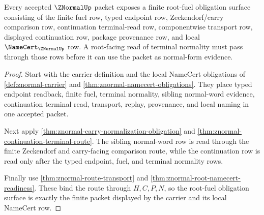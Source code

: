 \begin{theorem}
\label{thm:znormal-root-fuel-obligation-surface}
Every accepted $\ZNormalUp$ packet exposes a finite root-fuel obligation
surface consisting of the finite fuel row, typed endpoint row,
Zeckendorf/carry comparison row, continuation terminal-read row, componentwise
transport row, displayed continuation row, package provenance row, and local
$\NameCert_{\ZNormalUp}$ row. A root-facing read of terminal normality must
pass through those rows before it can use the packet as normal-form evidence.
\end{theorem}
\begin{proof}
Start with the carrier definition and the local NameCert obligations of
\autoref{def:znormal-carrier} and \autoref{thm:znormal-namecert-obligations}.
They place typed endpoint readback, finite fuel, terminal normality, sibling
normal-word evidence, continuation terminal read, transport, replay,
provenance, and local naming in one accepted packet.

Next apply \autoref{thm:znormal-carry-normalization-obligation} and
\autoref{thm:znormal-continuation-terminal-route}. The sibling normal-word row
is read through the finite Zeckendorf and carry-facing comparison route, while
the continuation row is read only after the typed endpoint, fuel, and terminal
normality rows.

Finally use \autoref{thm:znormal-route-transport} and
\autoref{thm:znormal-root-namecert-readiness}. These bind the route through
$H,C,P,N$, so the root-fuel obligation surface is exactly the finite packet
displayed by the carrier and its local NameCert row.
\end{proof}

